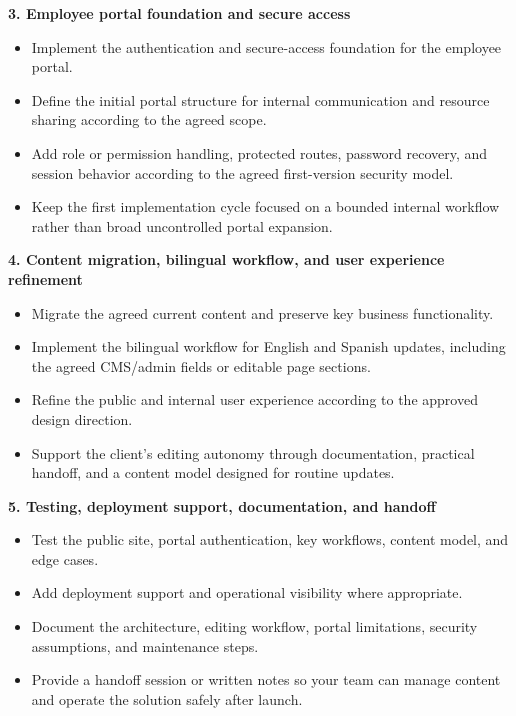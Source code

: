 \documentclass[11pt,a4paper]{article}
\begin{document}
\textbf{3. Employee portal foundation and secure access}\par

\begin{itemize}
\item Implement the authentication and secure-access foundation for the employee portal.
\item Define the initial portal structure for internal communication and resource sharing according to the agreed scope.
\item Add role or permission handling, protected routes, password recovery, and session behavior according to the agreed first-version security model.
\item Keep the first implementation cycle focused on a bounded internal workflow rather than broad uncontrolled portal expansion.
\end{itemize}

\textbf{4. Content migration, bilingual workflow, and user experience refinement}\par

\begin{itemize}
\item Migrate the agreed current content and preserve key business functionality.
\item Implement the bilingual workflow for English and Spanish updates, including the agreed CMS/admin fields or editable page sections.
\item Refine the public and internal user experience according to the approved design direction.
\item Support the client's editing autonomy through documentation, practical handoff, and a content model designed for routine updates.
\end{itemize}

\textbf{5. Testing, deployment support, documentation, and handoff}\par

\begin{itemize}
\item Test the public site, portal authentication, key workflows, content model, and edge cases.
\item Add deployment support and operational visibility where appropriate.
\item Document the architecture, editing workflow, portal limitations, security assumptions, and maintenance steps.
\item Provide a handoff session or written notes so your team can manage content and operate the solution safely after launch.
\end{itemize}
\end{document}
